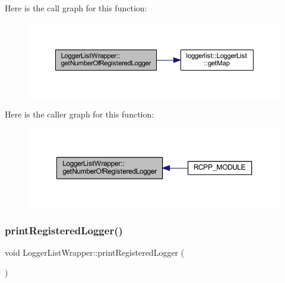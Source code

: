 Here is the call graph for this function\+:\nopagebreak
\begin{figure}[H]
\begin{center}
\leavevmode
\includegraphics[width=350pt]{class_logger_list_wrapper_aa95c80ea66ee0237ba97adaaddbb991d_cgraph}
\end{center}
\end{figure}
Here is the caller graph for this function\+:\nopagebreak
\begin{figure}[H]
\begin{center}
\leavevmode
\includegraphics[width=350pt]{class_logger_list_wrapper_aa95c80ea66ee0237ba97adaaddbb991d_icgraph}
\end{center}
\end{figure}
\mbox{\label{class_logger_list_wrapper_a9b23823777868fc0f0e9778f7eb48fcf}} 
\subsubsection{\texorpdfstring{print\+Registered\+Logger()}{printRegisteredLogger()}}
{\footnotesize\ttfamily void Logger\+List\+Wrapper\+::print\+Registered\+Logger (\begin{DoxyParamCaption}{ }\end{DoxyParamCaption})\hspace{0.3cm}{\ttfamily [inline]}}

